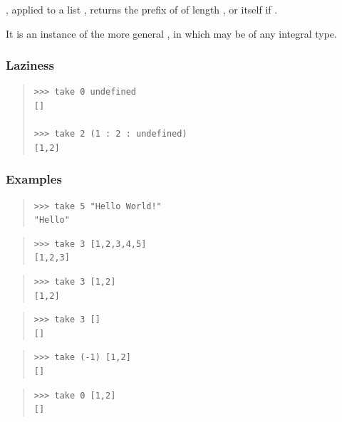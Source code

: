 \begin{haddockdesc}
\item[\begin{tabular}{@{}l}
take :: Int -> {\char 91}a{\char 93} -> {\char 91}a{\char 93}
\end{tabular}]
{\haddockbegindoc
{} , applied to a list , returns the prefix of 
 of length , or  itself if .\par
It is an instance of the more general ,
 in which  may be of any integral type.\par
\subsubsection*{\textbf{Laziness}}
\begin{quote}
{\haddockverb\begin{verbatim}
>>> take 0 undefined
[]

>>> take 2 (1 : 2 : undefined)
[1,2]

\end{verbatim}}
\end{quote}
\subsubsection*{\textbf{Examples}}
\begin{quote}
{\haddockverb\begin{verbatim}
>>> take 5 "Hello World!"
"Hello"

\end{verbatim}}
\end{quote}
\begin{quote}
{\haddockverb\begin{verbatim}
>>> take 3 [1,2,3,4,5]
[1,2,3]

\end{verbatim}}
\end{quote}
\begin{quote}
{\haddockverb\begin{verbatim}
>>> take 3 [1,2]
[1,2]

\end{verbatim}}
\end{quote}
\begin{quote}
{\haddockverb\begin{verbatim}
>>> take 3 []
[]

\end{verbatim}}
\end{quote}
\begin{quote}
{\haddockverb\begin{verbatim}
>>> take (-1) [1,2]
[]

\end{verbatim}}
\end{quote}
\begin{quote}
{\haddockverb\begin{verbatim}
>>> take 0 [1,2]
[]

\end{verbatim}}
\end{quote}}
\end{haddockdesc}
